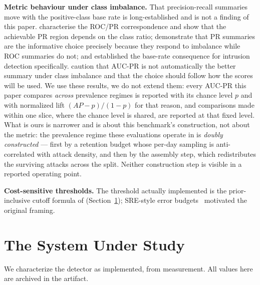 \documentclass[manuscript,anonymous,review]{acmart}
\begin{document}
\textbf{Metric behaviour under class imbalance.} That precision-recall
summaries move with the positive-class base rate is long-established and is not
a finding of this paper. \citet{davis2006prroc} characterise
the ROC/PR correspondence and show that the achievable PR region depends on the
class ratio; \citet{saito2015prplot} demonstrate that PR
summaries are the informative choice precisely because they respond to
imbalance while ROC summaries do not; and \citet{axelsson2000baserate}
established the base-rate consequence for intrusion detection specifically.
\citet{mcdermott2024closerlook} caution that AUC-PR is not
automatically the better summary under class imbalance and that the choice
should follow how the scores will be used. We
use these results, we do not extend them: every AUC-PR this paper compares
\emph{across} prevalence regimes is reported with its chance level $p$ and with
normalized lift $(AP-p)/(1-p)$ for that reason, and comparisons made within one
slice, where the chance level is shared, are reported at that fixed level. What is ours is narrower and is about this benchmark's
construction, not about the metric: the prevalence regime these evaluations
operate in is \emph{doubly constructed} --- first by a retention budget whose
per-day sampling is anti-correlated with attack density, and then by the
assembly step, which redistributes the surviving attacks across the split.
Neither construction step is visible in a reported operating point.

\textbf{Cost-sensitive thresholds.} The threshold actually implemented is the
prior-inclusive cutoff formula of \citet{elkan2001cost}
(Section~\ref{sec:detector}); SRE-style error budgets~\citep{beyer2016sre}
motivated the original framing.

\section{The System Under Study}
\label{sec:detector}

We characterize the detector as implemented, from measurement. All values here
are archived in the artifact.
\end{document}

